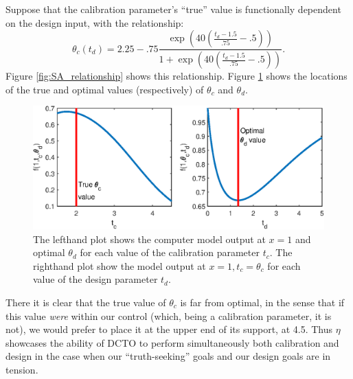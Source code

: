 \documentclass[12pt]{article}
\begin{document}
%
Suppose that the calibration parameter's ``true'' value is functionally dependent on the design input, with the relationship:
%
\[\theta_c(t_d)= 2.25 - .75 \frac{ \exp\left(40\left(\frac{t_d-1.5}{.75}-.5\right)\right)} {1 + \exp\left( 40\left(\frac{t_d-1.5}{.75}-.5\right) \right)}.\]
%
Figure \ref{fig:SA_relationship} shows this relationship.
%
Figure \ref{fig:true_vals} shows the locations of the true and optimal values (respectively) of $\theta_c$ and $\theta_d$.
%
\begin{figure}
	\centering
	\includegraphics[scale=0.85]{FIG_true_optimal_theta1_theta2.eps}
	\captionsetup{width=.85\linewidth}
	\caption{The lefthand plot shows the computer model output at $x=1$ and optimal $\theta_d$ for each value of the calibration parameter $t_c$. The righthand plot show the model output at $x=1,t_c=\theta_c$ for each value of the design parameter $t_d$.}
	\label{fig:true_vals}
\end{figure}
%
There it is clear that the true value of $\theta_c$ is far from optimal, in the sense that if this value \textit{were} within our control (which, being a calibration parameter, it is not), we would prefer to place it at the upper end of its support, at 4.5.
%
Thus $\eta$ showcases the ability of DCTO to perform simultaneously both calibration and design in the case when our ``truth-seeking'' goals and our design goals are in tension.
%
\end{document}
